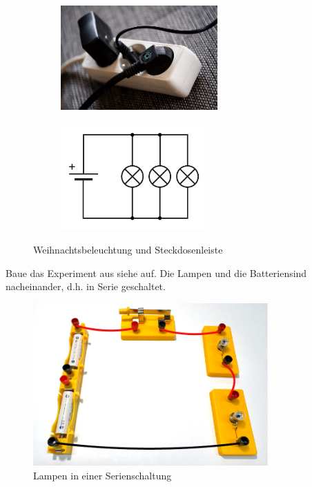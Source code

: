 \begin{figure}[h!]
\centering
    \begin{subfigure}[b]{0.46\textwidth}
    \centering
    \includegraphics[width=6cm]{_images/steckdosenleiste}
    \caption{\label{fig:powerstrip}}
    \end{subfigure}
\quad
    \begin{subfigure}[b]{0.46\textwidth}
    \centering
    \includegraphics[width=5.5cm]{_images/parallelschaltung_schaltplan}
    \caption{\label{fig:parallel_schematic}}
    \end{subfigure}

    \caption{Weihnachtsbeleuchtung und Steckdosenleiste}
\end{figure}



\newpage
{}

Baue das Experiment aus siehe  auf. Die
Lampen und die Batteriensind nacheinander, d.h. in Serie geschaltet.

\begin{figure}[h!]
    \centering
    \includegraphics[width=9cm]{_images/lampen_serie.pdf}
    \caption{Lampen in einer Serienschaltung}
    \label{fig:experiment_lamps_series}
\end{figure}

